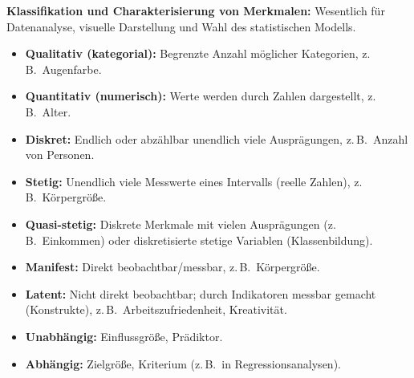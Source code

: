 \textbf{Klassifikation und Charakterisierung von Merkmalen:} Wesentlich für Datenanalyse, visuelle Darstellung und Wahl des statistischen Modells.

\begin{itemize}[leftmargin=1.5em]
    \item \textbf{Qualitativ (kategorial):} Begrenzte Anzahl möglicher Kategorien, z.\,B.\ Augenfarbe.
    \item \textbf{Quantitativ (numerisch):} Werte werden durch Zahlen dargestellt, z.\,B.\ Alter.
\end{itemize}

\begin{itemize}[leftmargin=1.5em]
    \item \textbf{Diskret:} Endlich oder abzählbar unendlich viele Ausprägungen, z.\,B.\ Anzahl von Personen.
    \item \textbf{Stetig:} Unendlich viele Messwerte eines Intervalls (reelle Zahlen), z.\,B.\ Körpergröße.
    \item \textbf{Quasi-stetig:} Diskrete Merkmale mit vielen Ausprägungen (z.\,B.\ Einkommen) oder diskretisierte stetige Variablen (Klassenbildung).
\end{itemize}

\begin{itemize}[leftmargin=1.5em]
    \item \textbf{Manifest:} Direkt beobachtbar/messbar, z.\,B.\ Körpergröße.
    \item \textbf{Latent:} Nicht direkt beobachtbar; durch Indikatoren messbar gemacht (Konstrukte), z.\,B.\ Arbeitszufriedenheit, Kreativität.
\end{itemize}

\begin{itemize}[leftmargin=1.5em]
    \item \textbf{Unabhängig:} Einflussgröße, Prädiktor.
    \item \textbf{Abhängig:} Zielgröße, Kriterium (z.\,B.\ in Regressionsanalysen).
\end{itemize}


